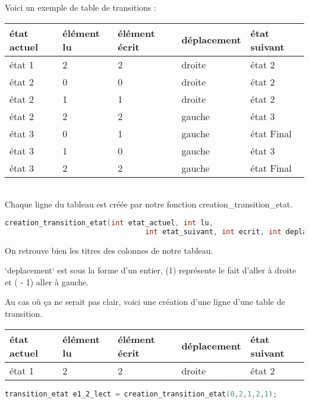 \documentclass[a4paper,10pt]{article}
\begin{document}
        Voici un exemple de table de transitions : 
        \\[1 em]
        \begin{tabular}{|l|l|l|l|l|}
          \hline
          état actuel & élément lu & élément  écrit & déplacement & état suivant\\
          \hline
          état 1 & 2 & 2 & droite & état 2 \\   
          \hline 
          état 2 & 0 & 0 & droite &  état 2 \\
          état 2 & 1 & 1 & droite &  état 2 \\
          état 2 & 2 & 2 & gauche &  état 3 \\
          \hline
          état 3 & 0 & 1 & gauche & état Final \\   
          état 3 & 1 & 0 & gauche & état 3 \\  
          état 3 & 2 & 2 & gauche & état Final \\
          \hline
        \end{tabular}
        \\[1 em] 
        
        Chaque ligne du tableau est créée par notre fonction creation\_transition\_etat. 
        
        \begin{lstlisting}[language=c]
        creation_transition_etat(int etat_actuel, int lu, 
                                 int etat_suivant, int ecrit, int deplacement )
        \end{lstlisting}
        
        On retrouve bien les titres des colonnes de notre tableau.
        
        `deplacement` est sous la forme d'un entier, (1) représente le fait d'aller à droite et ( - 1) aller à gauche.
        
        Au cas où ça ne serait pas clair, voici une création d'une ligne d'une table de transition.
        \\[1 em] 
        
        \begin{tabular}{|l|l|l|l|l|}
          \hline
          état actuel & élément lu & élément  écrit & déplacement & état suivant\\
          \hline
          état 1 & 2 & 2 & droite & état 2  \\
          \hline
        \end{tabular}
        
        \begin{lstlisting}[language=c]
        transition_etat e1_2_lect = creation_transition_etat(0,2,1,2,1);
        \end{lstlisting}
        
\end{document}
